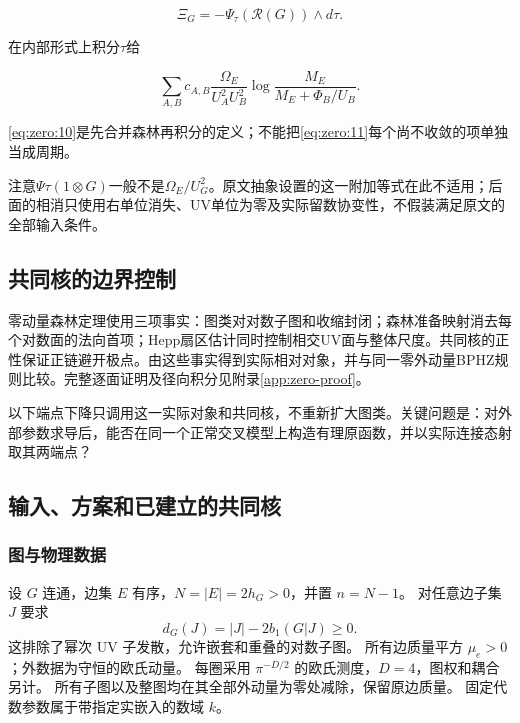 \documentclass[11pt,a4paper,oneside]{ctexart}
\theoremstyle{cnplain}
\theoremstyle{definition}
\theoremstyle{remark}
\newcommand{\Q}{\mathbb Q}
\newcommand{\im}{\operatorname{im}}
\newcommand{\Res}{\operatorname{Res}}
\newcommand{\dR}{\mathrm{dR}}
\numberwithin{equation}{section}
\begin{document}
\begin{equation}
\Xi_G=-\Psi_\tau(\mathcal R(G))\wedge d\tau.                  \label{eq:zero:10}
\end{equation}

在内部形式上积分\(\tau \)给

\begin{equation}
\sum_{A,B}c_{A,B}\frac{\Omega_E}{U_A^2U_B^2}
              \log\frac{M_E}{M_E+\Phi_B/U_B}.                 \label{eq:zero:11}
\end{equation}

\eqref{eq:zero:10}是先合并森林再积分的定义；不能把\eqref{eq:zero:11}每个尚不收敛的项单独当成周期。

注意\(\Psi \tau (1\otimes G)\)一般不是\(\Omega _E/U_G^{2}\)。原文抽象设置的这一附加等式在此不适用；后面的相消只使用右单位消失、UV单位为零及实际留数协变性，不假装满足原文的全部输入条件。


\endgroup
\subsection{共同核的边界控制}
零动量森林定理使用三项事实：图类对对数子图和收缩封闭；森林准备映射消去每个对数面的法向首项；Hepp扇区估计同时控制相交UV面与整体尺度。共同核的正性保证正链避开极点。由这些事实得到实际相对对象，并与同一零外动量BPHZ规则比较。完整逐面证明及径向积分见附录\ref{app:zero-proof}。

以下端点下降只调用这一实际对象和共同核，不重新扩大图类。关键问题是：对外部参数求导后，能否在同一个正常交叉模型上构造有理原函数，并以实际连接态射取其两端点？



\begingroup
\providecommand{\Q}{\mathbb Q}
\providecommand{\dR}{\mathrm{dR}}
\providecommand{\Res}{\operatorname{Res}}
\providecommand{\im}{\operatorname{im}}
\providecommand{\rk}{\operatorname{rk}}
\providecommand{\cR}{\mathcal R}
\providecommand{\cH}{\mathcal H}
\subsection{输入、方案和已建立的共同核}
\subsubsection{图与物理数据}
设 $G$ 连通，边集 $E$ 有序，$N=|E|=2h_G>0$，并置 $n=N-1$。
对任意边子集 $J$ 要求
\begin{equation}\label{descent:eq:power}
 d_G(J)=|J|-2b_1(G|J)\geq0.
\end{equation}
这排除了幂次 UV 子发散，允许嵌套和重叠的对数子图。
所有边质量平方 $\mu_e>0$；外数据为守恒的欧氏动量。
每圈采用 $\pi^{-D/2}$ 的欧氏测度，$D=4$，图权和耦合另计。
所有子图以及整图均在其全部外动量为零处减除，保留原边质量。
固定代数参数属于带指定实嵌入的数域 $k$。
\end{document}
